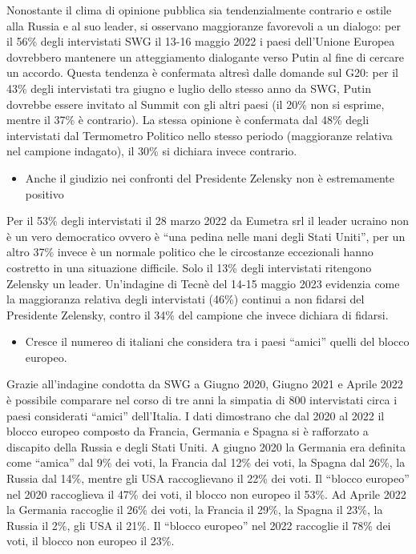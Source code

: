 \documentclass[
]{book}
\providecommand{\tightlist}{%
  \setlength{\itemsep}{0pt}\setlength{\parskip}{0pt}}
\begin{document}
Nonostante il clima di opinione pubblica sia tendenzialmente contrario e ostile alla Russia e al suo leader, si osservano maggioranze favorevoli a un dialogo: per il 56\% degli intervistati SWG il 13-16 maggio 2022 i paesi dell'Unione Europea dovrebbero mantenere un atteggiamento dialogante verso Putin al fine di cercare un accordo. Questa tendenza è confermata altresì dalle domande sul G20: per il 43\% degli intervistati tra giugno e luglio dello stesso anno da SWG, Putin dovrebbe essere invitato al Summit con gli altri paesi (il 20\% non si esprime, mentre il 37\% è contrario). La stessa opinione è confermata dal 48\% degli intervistati dal Termometro Politico nello stesso periodo (maggioranze relativa nel campione indagato), il 30\% si dichiara invece contrario.

\begin{itemize}
\tightlist
\item
  Anche il giudizio nei confronti del Presidente Zelensky non è estremamente positivo
\end{itemize}

Per il 53\% degli intervistati il 28 marzo 2022 da Eumetra srl il leader ucraino non è un vero democratico ovvero è ``una pedina nelle mani degli Stati Uniti'', per un altro 37\% invece è un normale politico che le circostanze eccezionali hanno costretto in una situazione difficile. Solo il 13\% degli intervistati ritengono Zelensky un leader. Un'indagine di Tecnè del 14-15 maggio 2023 evidenzia come la maggioranza relativa degli intervistati (46\%) continui a non fidarsi del Presidente Zelensky, contro il 34\% del campione che invece dichiara di fidarsi.

\begin{itemize}
\tightlist
\item
  Cresce il numereo di italiani che considera tra i paesi ``amici'' quelli del blocco europeo.
\end{itemize}

Grazie all'indagine condotta da SWG a Giugno 2020, Giugno 2021 e Aprile 2022 è possibile comparare nel corso di tre anni la simpatia di 800 intervistati circa i paesi considerati ``amici'' dell'Italia. I dati dimostrano che dal 2020 al 2022 il blocco europeo composto da Francia, Germania e Spagna si è rafforzato a discapito della Russia e degli Stati Uniti. A giugno 2020 la Germania era definita come ``amica'' dal 9\% dei voti, la Francia dal 12\% dei voti, la Spagna dal 26\%, la Russia dal 14\%, mentre gli USA raccoglievano il 22\% dei voti. Il ``blocco europeo'' nel 2020 raccoglieva il 47\% dei voti, il blocco non europeo il 53\%. Ad Aprile 2022 la Germania raccoglie il 26\% dei voti, la Francia il 29\%, la Spagna il 23\%, la Russia il 2\%, gli USA il 21\%. Il ``blocco europeo'' nel 2022 raccoglie il 78\% dei voti, il blocco non europeo il 23\%.
\end{document}
